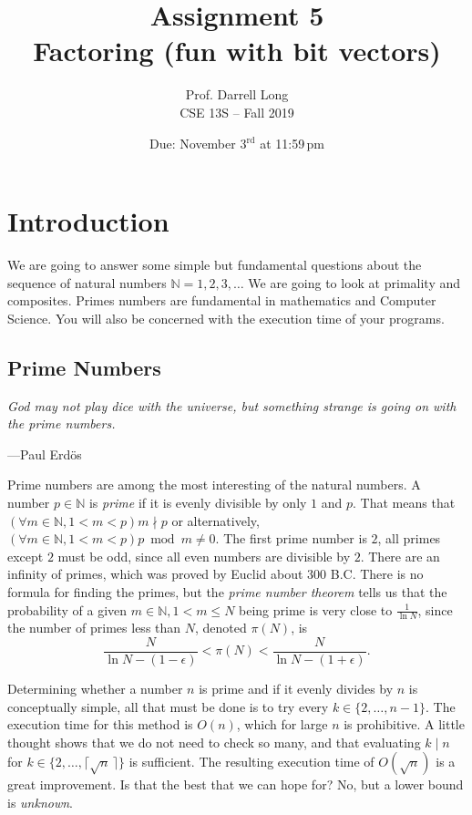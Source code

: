 \documentclass{article}
\title{Assignment 5 \\ Factoring (fun with bit vectors)}
\author{Prof. Darrell Long \\
CSE 13S -- Fall 2019}
\date{Due: November 3$^\text{rd}$ at 11:59\,pm}
\begin{document}
\maketitle

\lstset{language=C, style=c99}

\section{Introduction}

We are going to answer some simple but fundamental questions about
the sequence of natural numbers ${\mathbb N} = 1, 2, 3, \ldots$ We
are going to look at primality and composites.
Primes numbers are fundamental in mathematics and Computer Science. You will also be concerned with the execution time of your programs.

\subsection{Prime Numbers}
\textwidth
\epigraph{\emph{God may not play dice with the universe, but something strange is going on with the prime numbers.}}{---Paul Erd\"os}

Prime numbers are among the most interesting of the natural numbers.
A number $p \in \mathbb{N}$ is \emph{prime} if it is evenly divisible
by only $1$ and $p$.  That means that $(\forall m \in \mathbb{N},
1 < m < p) m \nmid p$ or alternatively, $(\forall m \in \mathbb{N},
1 < m < p)p \bmod m \ne 0$.  The first prime number is $2$, all
primes except $2$ must be odd, since all even numbers are divisible
by $2$.  There are an infinity of primes, which was proved by Euclid
about 300 B.C.  There is no formula for finding the primes, but the
\emph{prime number theorem} tells us that the probability of a given
$m\in \mathbb{N}, 1<m\le N$ being prime is very close to $\tfrac{1}{\ln N}$, since
the number of primes less than $N$, denoted $\pi(N)$, is
$$
\frac{N}{\ln N - (1 - \epsilon)} < \pi(N) < \frac{N}{\ln N - (1 +
\epsilon)}.
$$

Determining whether a number $n$ is prime and if it evenly divides by $n$ is conceptually simple, all that must be done is to try every $k \in \{ 2, \ldots, n - 1\}$.
The execution time for this method is $O(n)$, which for large $n$ is prohibitive.
A little thought shows that we do not need to check so many, and that evaluating
$k \mid n$ for $k\in \{2, \ldots, \lceil \sqrt{n} \,\rceil \}$ is sufficient.
The resulting execution time of $O(\sqrt{n})$ is a great improvement.
Is that the best that we can hope for? No, but a lower bound is \emph{unknown}.
\end{document}
